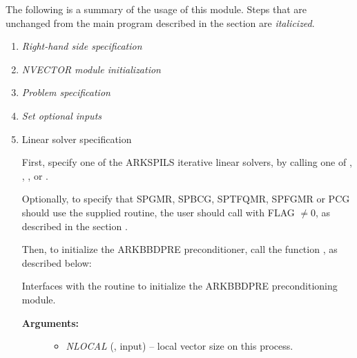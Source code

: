\documentclass[letterpaper,10pt,english]{sphinxmanual}
\begin{document}
The following is a summary of the usage of this module. Steps that are
unchanged from the main program described in the section
{\hyperref[f_interface/Usage:finterface-usage]{\emph{}}} are \emph{italicized}.
\begin{enumerate}
\item {} 
\emph{Right-hand side specification}

\item {} 
\emph{NVECTOR module initialization}

\item {} 
\emph{Problem specification}

\item {} 
\emph{Set optional inputs}

\item {} 
Linear solver specification

First, specify one of the ARKSPILS iterative linear solvers, by
calling one of {\hyperref[f_interface/Usage:f/_/FARKSPGMR]{\emph{}}}, {\hyperref[f_interface/Usage:f/_/FARKSPBCG]{\emph{}}},
{\hyperref[f_interface/Usage:f/_/FARKSPTFQMR]{\emph{}}}, {\hyperref[f_interface/Usage:f/_/FARKSPFGMR]{\emph{}}} or
{\hyperref[f_interface/Usage:f/_/FARKPCG]{\emph{}}}.

Optionally, to specify that SPGMR, SPBCG, SPTFQMR, SPFGMR or PCG
should use the supplied {\hyperref[f_interface/Usage:f/_/FARKJTIMES]{\emph{}}} routine, the user
should call {\hyperref[f_interface/Usage:f/_/FARKSPILSSETJAC]{\emph{}}} with FLAG \(\ne 0\),
as described in the section {\hyperref[f_interface/Usage:finterface-spilsusersupplied]{\emph{}}}.

Then, to initialize the ARKBBDPRE preconditioner, call the function
{\hyperref[f_interface/Preconditioning:f/_/FARKBBDINIT]{\emph{}}}, as described below:

\begin{fulllineitems}
\label{f_interface/Preconditioning:f/_/FARKBBDINIT}
Interfaces with the {\hyperref[c_interface/Preconditioners:c.ARKBBDPrecInit]{\emph{}}}
routine to initialize the ARKBBDPRE preconditioning module.
\begin{description}
\item[{\textbf{Arguments:}}] \leavevmode\begin{itemize}
\item {} 
\emph{NLOCAL} (, input) -- local vector size on this
process.


\end{itemize}
\end{description}
\end{fulllineitems}
\end{enumerate}
\end{document}
